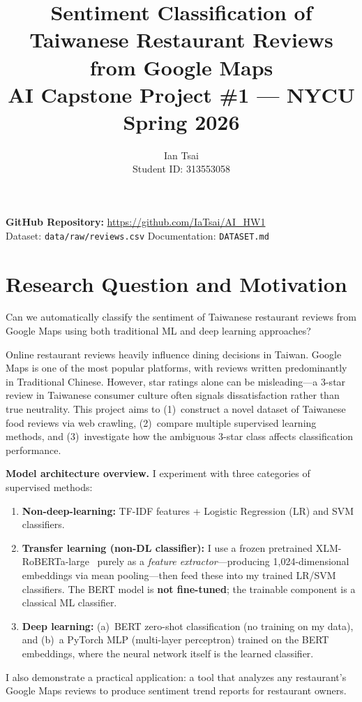 \documentclass[12pt]{article}
\title{\Large\textbf{Sentiment Classification of Taiwanese Restaurant Reviews\\from Google Maps}\\[6pt]
\large AI Capstone Project \#1 --- NYCU Spring 2026}
\author{Ian Tsai \\ Student ID: 313553058}
\date{}
\begin{document}
\maketitle

\textbf{GitHub Repository:} \url{https://github.com/IaTsai/AI_HW1}\\
{\small Dataset: \texttt{data/raw/reviews.csv} \quad Documentation: \texttt{DATASET.md}}

\section{Research Question and Motivation}

Can we automatically classify the sentiment of Taiwanese restaurant reviews from Google Maps using both traditional ML and deep learning approaches?

Online restaurant reviews heavily influence dining decisions in Taiwan.
Google Maps is one of the most popular platforms, with reviews written predominantly in Traditional Chinese.
However, star ratings alone can be misleading---a 3-star review in Taiwanese consumer culture often signals dissatisfaction rather than true neutrality.
This project aims to (1)~construct a novel dataset of Taiwanese food reviews via web crawling, (2)~compare multiple supervised learning methods, and (3)~investigate how the ambiguous 3-star class affects classification performance.

\textbf{Model architecture overview.}
I experiment with three categories of supervised methods:
\begin{enumerate}[nosep]
  \item \textbf{Non-deep-learning:} TF-IDF features + Logistic Regression (LR) and SVM classifiers.
  \item \textbf{Transfer learning (non-DL classifier):} I use a frozen pretrained XLM-RoBERTa-large~\citep{conneau2020xlmr} purely as a \textit{feature extractor}---producing 1{,}024-dimensional embeddings via mean pooling---then feed these into my trained LR/SVM classifiers. The BERT model is \textbf{not fine-tuned}; the trainable component is a classical ML classifier.
  \item \textbf{Deep learning:} (a)~BERT zero-shot classification (no training on my data), and (b)~a PyTorch MLP (multi-layer perceptron) trained on the BERT embeddings, where the neural network itself is the learned classifier.
\end{enumerate}
I also demonstrate a practical application: a tool that analyzes any restaurant's Google Maps reviews to produce sentiment trend reports for restaurant owners.
\end{document}
